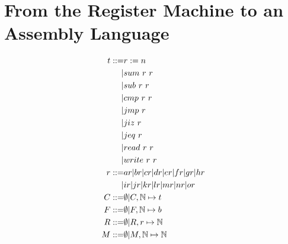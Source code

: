 \documentclass{article}
\begin{document}
\section{From the Register Machine to an Assembly Language}
\begin{align*}
    t ::= & r:=n \\
        |& sum\ r\ r \\
        |& sub\ r\ r \\
        |& cmp\ r\ r \\
        |& jmp\ r \\
        |& jiz\ r \\
        |& jeq\ r \\
        |& read\ r\ r \\
        |& write\ r\ r \\
    r ::= & ar|br|cr|dr|er|fr|gr|hr \\
        |&ir|jr|kr|lr|mr|nr|or \\
    C ::=& \emptyset | C,\N\mapsto t \\
    F ::=& \emptyset | F,\N\mapsto b \\
    R ::=& \emptyset | R, r\mapsto \N \\
    M ::=& \emptyset | M, \N\mapsto \N \\
\end{align*}
\end{document}
